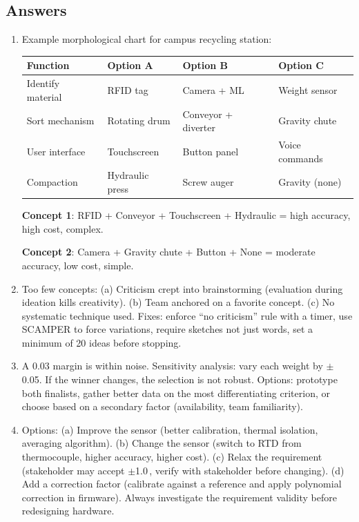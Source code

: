 \subsection{Answers}
\begin{enumerate}[leftmargin=1.5em]
\item Example morphological chart for campus recycling station:

\small
\begin{tabularx}{\linewidth}{l X X X}
\toprule
Function & Option A & Option B & Option C \\
\midrule
Identify material & RFID tag & Camera + ML & Weight sensor \\
Sort mechanism & Rotating drum & Conveyor + diverter & Gravity chute \\
User interface & Touchscreen & Button panel & Voice commands \\
Compaction & Hydraulic press & Screw auger & Gravity (none) \\
\bottomrule
\end{tabularx}
\normalsize

\textbf{Concept 1}: RFID + Conveyor + Touchscreen + Hydraulic = high accuracy, high cost, complex.

\textbf{Concept 2}: Camera + Gravity chute + Button + None = moderate accuracy, low cost, simple.

\item Too few concepts: (a) Criticism crept into brainstorming (evaluation during ideation kills creativity). (b) Team anchored on a favorite concept. (c) No systematic technique used. Fixes: enforce ``no criticism'' rule with a timer, use SCAMPER to force variations, require sketches not just words, set a minimum of 20 ideas before stopping.

\item A 0.03 margin is within noise. Sensitivity analysis: vary each weight by $\pm$0.05. If the winner changes, the selection is not robust. Options: prototype both finalists, gather better data on the most differentiating criterion, or choose based on a secondary factor (availability, team familiarity).

\item Options: (a) Improve the sensor (better calibration, thermal isolation, averaging algorithm). (b) Change the sensor (switch to RTD from thermocouple, higher accuracy, higher cost). (c) Relax the requirement (stakeholder may accept $\pm$1.0\,\degC{}, verify with stakeholder before changing). (d) Add a correction factor (calibrate against a reference and apply polynomial correction in firmware). Always investigate the requirement validity before redesigning hardware.


\end{enumerate}
